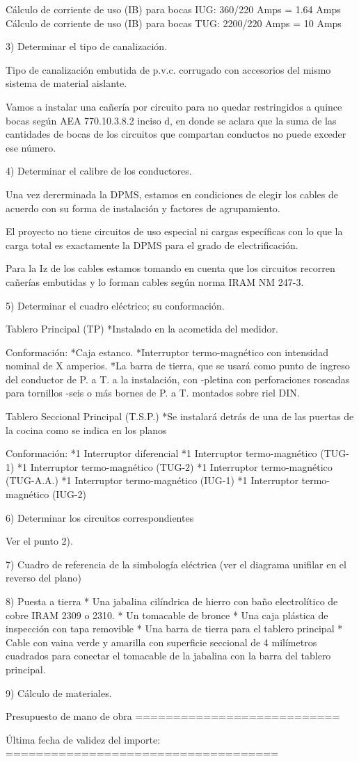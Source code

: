Cálculo de corriente de uso (IB) para bocas IUG:  360/220 Amps =  1.64 Amps
Cálculo de corriente de uso (IB) para bocas TUG: 2200/220 Amps = 10    Amps

3) Determinar el tipo de canalización.

Tipo de canalización embutida de p.v.c. corrugado con accesorios del mismo sistema de 
material aislante.

Vamos a instalar una cañería por circuito para no quedar restringidos a quince bocas según 
AEA 770.10.3.8.2 inciso d, en donde se aclara que la suma de las cantidades de bocas de 
los circuitos que compartan conductos no puede exceder ese número. 

4) Determinar el calibre de los conductores.

Una vez dererminada la DPMS, estamos en condiciones de elegir los cables de acuerdo
con su forma de instalación y factores de agrupamiento.

El proyecto no tiene circuitos de uso especial ni cargas específicas con lo que 
la carga total es exactamente la DPMS para el grado de electrificación.

Para la Iz de los cables estamos tomando en cuenta que los circuitos recorren cañerías
embutidas y lo forman cables según norma IRAM NM 247-3.

5) Determinar el cuadro eléctrico; su conformación.
 
Tablero Principal (TP)
*Instalado en la acometida del medidor. 

Conformación:
*Caja estanco.
*Interruptor termo-magnético con intensidad nominal de X amperios.
*La barra de tierra, que se usará como punto de ingreso del conductor de P. a T. a la instalación, con
         -pletina con perforaciones roscadas para tornillos
	 -seis o más bornes de P. a T. montados sobre riel DIN.

Tablero Seccional Principal (T.S.P.)
*Se instalará detrás de una de las puertas de la cocina como se indica en los planos 

Conformación:
*1 Interruptor diferencial
*1 Interruptor termo-magnético (TUG-1)
*1 Interruptor termo-magnético (TUG-2)
*1 Interruptor termo-magnético (TUG-A.A.)
*1 Interruptor termo-magnético (IUG-1)
*1 Interruptor termo-magnético (IUG-2)

6) Determinar los circuitos correspondientes

Ver el punto 2).

7) Cuadro de referencia de la simbología eléctrica (ver el diagrama unifilar en el reverso del plano)

8) Puesta a tierra
* Una jabalina cilíndrica de hierro con baño electrolítico de cobre IRAM 2309 o 2310.
* Un tomacable de bronce
* Una caja plástica de inspección con tapa removible
* Una barra de tierra para el tablero principal
* Cable con vaina verde y amarilla con superficie seccional de 4 milímetros cuadrados para conectar
el tomacable de la jabalina con la barra del tablero principal.

9) Cálculo de materiales.

Presupuesto de mano de obra 
===========================

Última fecha de validez del importe:
====================================

